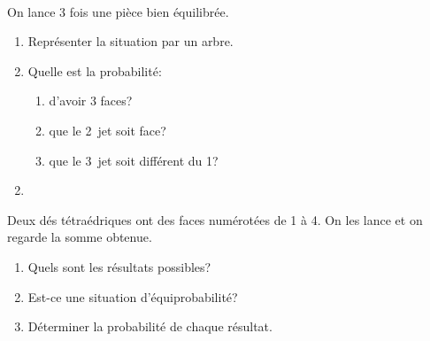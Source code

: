 \begin{exercice*}\\\label{2SP3_E_équiprobabilité}
On lance 3 fois une pièce bien équilibrée.
\begin{enumerate}
\item Représenter la situation par un arbre.
\item Quelle est la probabilité: 
\begin{enumerate}
\item d'avoir 3 faces?
\item que le 2\ieme\ jet soit face?
\item que le 3\ieme\ jet soit différent du 1\ier? 
\end{enumerate}
\end{enumerate}
\begin{corrige}
\begin{enumerate}
\setcounter{enumi}{1}
\item {}
\end{enumerate}
\end{corrige}
\end{exercice*}

\begin{exercice}
Deux dés tétraédriques ont des faces numérotées de 1 à 4. On les lance et on regarde la somme obtenue.
\begin{enumerate}
\item Quels sont les résultats possibles?
\item Est-ce une situation d'équiprobabilité?
\item Déterminer la probabilité de chaque résultat.
\end{enumerate}
\end{exercice}

